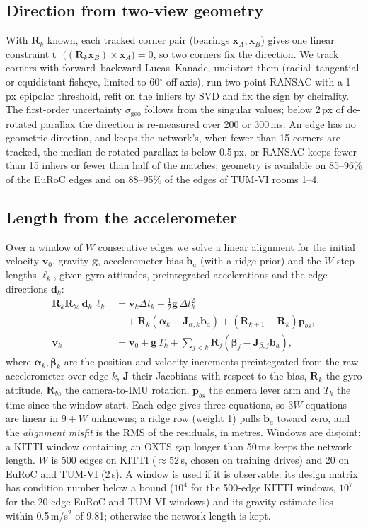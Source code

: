 \documentclass[letterpaper,journal]{IEEEtran}
\begin{document}
\subsection{Direction from two-view geometry}
With $\mathbf{R}_k$ known, each tracked corner pair (bearings $\mathbf{x}_A,\mathbf{x}_B$) gives one linear constraint $\mathbf{t}^\top\big((\mathbf{R}_k\mathbf{x}_B)\times\mathbf{x}_A\big)=0$, so two corners fix the direction. We track corners with forward--backward Lucas--Kanade, undistort them (radial--tangential or equidistant fisheye, limited to 60$^\circ$ off-axis), run two-point RANSAC with a 1\,px epipolar threshold, refit on the inliers by SVD and fix the sign by cheirality. The first-order uncertainty $\sigma_{\mathrm{geo}}$ follows from the singular values; below 2\,px of de-rotated parallax the direction is re-measured over 200 or 300\,ms. An edge has no geometric direction, and keeps the network's, when fewer than 15 corners are tracked, the median de-rotated parallax is below 0.5\,px, or RANSAC keeps fewer than 15 inliers or fewer than half of the matches; geometry is available on 85--96\% of the EuRoC edges and on 88--95\% of the edges of TUM-VI rooms 1--4.

\subsection{Length from the accelerometer}
Over a window of $W$ consecutive edges we solve a linear alignment \cite{Qin2017} for the initial velocity $\mathbf v_0$, gravity $\mathbf g$, accelerometer bias $\mathbf b_a$ (with a ridge prior) and the $W$ step lengths $\ell_k$, given gyro attitudes, preintegrated accelerations and the edge directions $\mathbf d_k$:
\begin{align}
\mathbf R_k\mathbf R_{bs}\,\mathbf d_k\,\ell_k &= \mathbf v_k\Delta t_k+\tfrac12\mathbf g\,\Delta t_k^2\nonumber\\
&\quad+\mathbf R_k(\boldsymbol\alpha_k-\mathbf J_{\alpha,k}\mathbf b_a)+(\mathbf R_{k+1}-\mathbf R_k)\mathbf p_{bs},\label{eq:align}\\
\mathbf v_k &= \mathbf v_0+\mathbf g\,T_k+\textstyle\sum_{j<k}\mathbf R_j(\boldsymbol\beta_j-\mathbf J_{\beta,j}\mathbf b_a),\nonumber
\end{align}
where $\boldsymbol\alpha_k,\boldsymbol\beta_k$ are the position and velocity increments preintegrated from the raw accelerometer over edge $k$, $\mathbf J$ their Jacobians with respect to the bias, $\mathbf R_k$ the gyro attitude, $\mathbf R_{bs}$ the camera-to-IMU rotation, $\mathbf p_{bs}$ the camera lever arm and $T_k$ the time since the window start. Each edge gives three equations, so $3W$ equations are linear in $9+W$ unknowns; a ridge row (weight 1) pulls $\mathbf b_a$ toward zero, and the \emph{alignment misfit} is the RMS of the residuals, in metres. Windows are disjoint; a KITTI window containing an OXTS gap longer than 50\,ms keeps the network length. $W$ is 500 edges on KITTI ($\approx$52\,s, chosen on training drives) and 20 on EuRoC and TUM-VI (2\,s). A window is used if it is observable: its design matrix has condition number below a bound ($10^4$ for the 500-edge KITTI windows, $10^7$ for the 20-edge EuRoC and TUM-VI windows) and its gravity estimate lies within 0.5\,m/s$^2$ of 9.81; otherwise the network length is kept.
\end{document}
